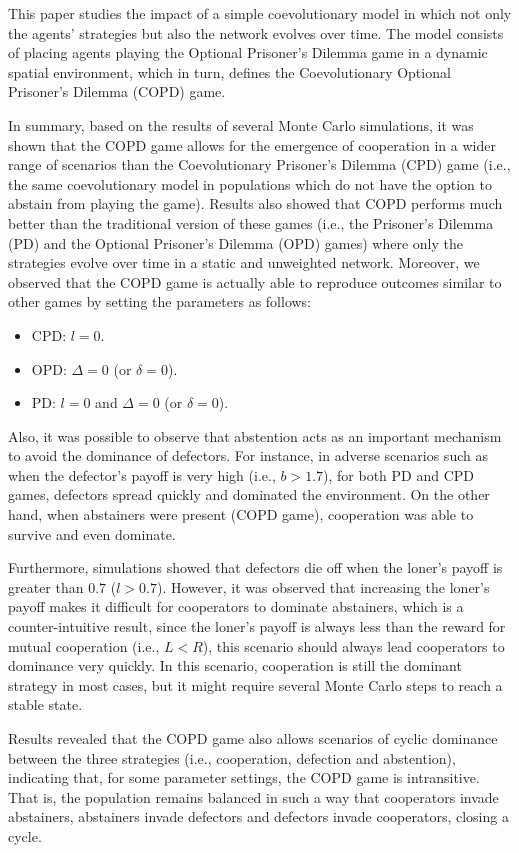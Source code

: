 \documentclass{llncs}
\begin{document}
This paper studies the impact of a simple coevolutionary model in which not
only the agents’ strategies but also the network evolves over time. The model
consists of placing agents playing the Optional Prisoner’s Dilemma game in a
dynamic spatial environment, which in turn, defines the Coevolutionary Optional
Prisoner’s Dilemma (COPD) game.

In summary, based on the results of several Monte Carlo simulations, it was
shown that the COPD game allows for the emergence of cooperation in a wider
range of scenarios than the Coevolutionary Prisoner’s Dilemma (CPD) game (i.e.,
the same coevolutionary model in populations which do not have the option to
abstain from playing the game). Results also showed that COPD performs much
better than the traditional version of these games (i.e., the Prisoner’s
Dilemma (PD) and the Optional Prisoner’s Dilemma (OPD) games) where only the
strategies evolve over time in a static and unweighted network.
Moreover, we observed that the COPD game is actually able to reproduce outcomes
similar to other games by setting the parameters as follows:
\begin{itemize}
    \item CPD: $l=0$.
    \item OPD: $\Delta=0$ (or $\delta=0$).
    \item PD: $l=0$ and $\Delta=0$ (or $\delta=0$).
\end{itemize}

Also, it was possible to observe that abstention acts as an important
mechanism to avoid the dominance of defectors. For instance, in adverse
scenarios such as when the defector’s payoff is very high (i.e., $b>1.7$), for both
PD and CPD games, defectors spread quickly and dominated the environment. On
the other hand, when abstainers were present (COPD game), cooperation was able
to survive and even dominate.

Furthermore, simulations showed that defectors die off when the loner’s payoff is
greater than $0.7$ ($l>0.7$). However, it was observed that increasing the loner’s
payoff makes it difficult for cooperators to dominate abstainers, which is a
counter-intuitive result, since the loner’s payoff is always less than the
reward for mutual cooperation (i.e., $L < R$), this scenario should always lead
cooperators to dominance very quickly. In this scenario, cooperation is still
the dominant strategy in most cases, but it might require several Monte Carlo
steps to reach a stable state.

Results revealed that the COPD game also allows scenarios of cyclic dominance
between the three strategies (i.e., cooperation, defection and abstention),
indicating that, for some parameter settings, the COPD game is intransitive.
That is, the population remains balanced in such a way that cooperators invade
abstainers, abstainers invade defectors and defectors invade cooperators,
closing a cycle.
\end{document}
